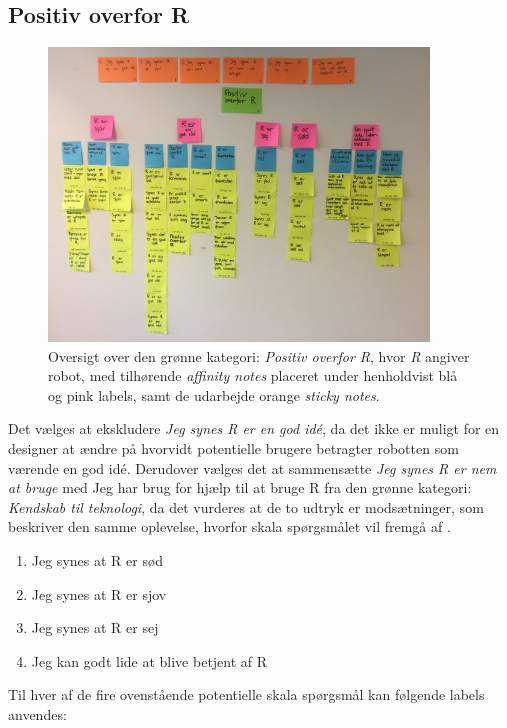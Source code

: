 \subsection{Positiv overfor R}
\label{ParametrePositivOverforR}
%
\begin{figure}[H]
\centering
\includegraphics[width = 0.9\textwidth]{Figure/AffinityDiagram/PositivOverforR} 
\caption{Oversigt over den grønne kategori: \textit{Positiv overfor R}, hvor \textit{R} angiver robot, med tilhørende \textit{affinity notes} placeret under henholdvist blå og pink labels, samt de udarbejde orange \textit{sticky notes}.}
\label{fig:AFPositivOverforR}
\end{figure}
\noindent
%
Det vælges at ekskludere \textit{Jeg synes R er en god idé}, da det ikke er muligt for en designer at ændre på hvorvidt potentielle brugere betragter robotten som værende en god idé. Derudover vælges det at sammensætte \textit{Jeg synes R er nem at bruge} med {Jeg har brug for hjælp til at bruge R} fra den grønne kategori: \textit{Kendskab til teknologi}, da det vurderes at de to udtryk er modsætninger, som beskriver den samme oplevelse, hvorfor skala spørgsmålet vil fremgå af .\blankline  
%
\begin{enumerate}
  \item Jeg synes at R er sød
  \item Jeg synes at R er sjov
  \item Jeg synes at R er sej
  \item Jeg kan godt lide at blive betjent af R\blankline
\end{enumerate}
%
Til hver af de fire ovenstående potentielle skala spørgsmål kan følgende labels anvendes:
